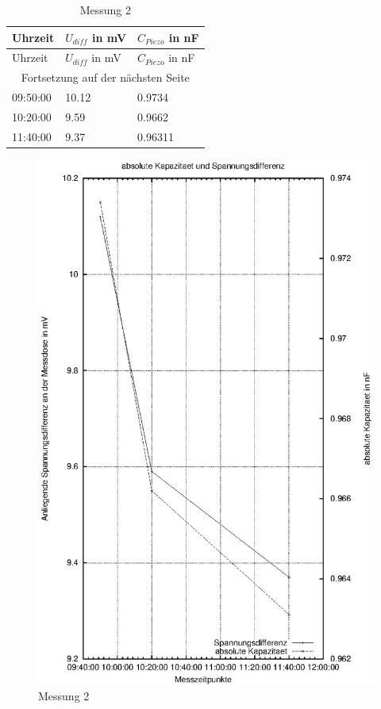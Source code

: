 \documentclass[12pt]{scrreprt} %
\begin{document}
\setlongtables
\begin{longtable}{| l | l | l |}
\caption{Messung 2 }\\
\hline
Uhrzeit&$U_{diff}$ in mV&$C_{Piezo}$ in nF\\
\hline
\endfirsthead
\hline
Uhrzeit&$U_{diff}$ in mV&$C_{Piezo}$ in nF\\
\hline
\endhead
\hline
\multicolumn{3}{|c|}{Fortsetzung auf der nächsten Seite}\\
\hline
\endfoot
\hline \hline
\endlastfoot
\hline
\label{tab:2.2}%
09:50:00&10.12&0.9734\\
10:20:00&9.59&0.9662\\
11:40:00&9.37&0.96311\\
\end{longtable}

\begin {figure}[htbp]
      \begin{center}
        \includegraphics{tabelle2_1_2}
      \end{center}
\caption{Messung 2}
\label{fig:2.2}
\end{figure}
\newpage
\end{document}
